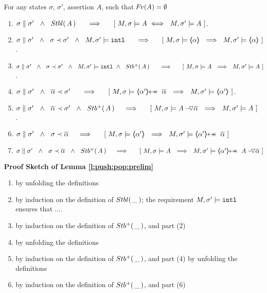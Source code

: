 {\begin{lemma}
For any states $\sigma$, $\sigma'$, assertion $A$,  such that ${\hspace{-1pt}F\hspace{-1pt}}v(A)=\emptyset$
\label{l:push:pop:prelim}
\begin{enumerate}
\item
$\sigma \parallel \sigma'\ \ \wedge \ \ {Stbl(\, A\, )}\  \ \ \ \ \Longrightarrow\  \ \ \ \ [ \ M, \sigma \models A  \ \Longleftrightarrow \ \ M, \sigma' \models A\ ] $.
\item
$\sigma \parallel \sigma'\ \ \wedge \ \ \sigma \prec \sigma'\ \ \wedge  \ \ M, \sigma' \models \intThis\  \ \ \ \ \Longrightarrow\  \ \ \ \ [ \ M, \sigma \models \inside \alpha \ \ \Longrightarrow \ \ M, \sigma' \models  \inside \alpha\ ]$.
\item
$\sigma \parallel \sigma'\ \ \wedge \ \ \sigma \prec \sigma'\ \ \wedge  \ \ M, \sigma' \models \mbox{\normalfont{\texttt{intl}}}\ \wedge \ \ {Stb^+(\, A\, )} \  \ \ \ \ \Longrightarrow\  \ \ \ \ [ \ M, \sigma \models A \ \ \Longrightarrow \ \ M, \sigma' \models A\ ]$.
\item
 $\sigma \parallel \sigma'\ \ \wedge \ \ \overline \alpha \prec \sigma'\  \ \ \ \ \Longrightarrow\  \ \ \ \ [ \ M, \sigma \models \protectedFrom {\alpha'} {\overline \alpha} \ \ \Longrightarrow \ \ M, \sigma' \models \inside {\alpha'}\ ]$.
\item
 $\sigma \parallel \sigma'\ \ \wedge \ \ \overline \alpha \prec \sigma'\ \  \wedge \ \ {Stb^+(\, A\, )}   \ \ \ \ \Longrightarrow\  \ \ \ \ [ \ M, \sigma \models  {\ensuremath{ {A} -\!\!\!\,\!{\triangledown} \overline{\alpha} }}  \ \ \Longrightarrow \ \ M, \sigma' \models A\ ]$.
\item
$\sigma \parallel \sigma'\ \ \wedge \ \ \sigma \prec {\overline \alpha}%
  \ \ \ \ \Longrightarrow\  \ \ \ \ [ \ M, \sigma   \models \inside {\alpha'} \ \ \Longrightarrow \ \ M, \sigma' \models \protectedFrom {\alpha'} {\overline \alpha} \ ]$
\item
$\sigma \parallel \sigma'\ \ \wedge \ \ \sigma \prec {\overline \alpha}\ \  \wedge \ \ \Pos A   \ \ \ \ \Longrightarrow\  \ \ \ \ [ \ M, \sigma   \models A \ \ \Longrightarrow \ \ M, \sigma' \models \protectedFrom {\alpha'} {\PushAS   {\alpha} {A}} \ ]$
\end{enumerate}
\end{lemma}

{\textbf{Proof Sketch  of Lemma \ref{l:push:pop:prelim}}}
\begin{enumerate}
\item
by unfolding the definitions
\item
by induction on the definition of ${Stbl(\, \_\, )}$; the requirement $M, \sigma' \models \mbox{\normalfont{\texttt{intl}}}$ ensures that ....
\item
by induction on the definition of ${Stb^+(\, \_\, )}$, and part (2)
\item
by unfolding the definitions
\item
by induction on the definition of ${Stb^+(\, \_\, )}$, and part (4)
by unfolding the definitions
\item
by induction on the definition of ${Stb^+(\, \_\, )}$, and part (6)


\end{enumerate}}
